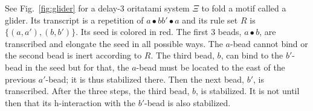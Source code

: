 \documentclass[twocolumn]{svjour3}
\begin{document}
\begin{example}
	See Fig.~\ref{fig:glider} for a delay-3 oritatami system $\Xi$ to fold a motif called a glider. 
	Its transcript is a repetition of $a \bullet b b' \bullet a$ and its rule set $R$ is $\{(a, a'), (b, b')\}$. 
	Its seed is colored in red. 
	The first 3 beads, $a \bullet b$, are transcribed and elongate the seed in all possible ways. 
	The $a$-bead cannot bind or the second bead is inert according to $R$. 
	The third bead, $b$, can bind to the $b'$-bead in the seed but for that, the $a$-bead must be located to the east of the previous $a'$-bead; it is thus stabilized there. 
	Then the next bead, $b'$, is transcribed. 
	After the three steps, the third bead, $b$, is stabilized. 
	It is not until then that its h-interaction with the $b'$-bead is also stabilized. 
\end{example}


\end{document}
